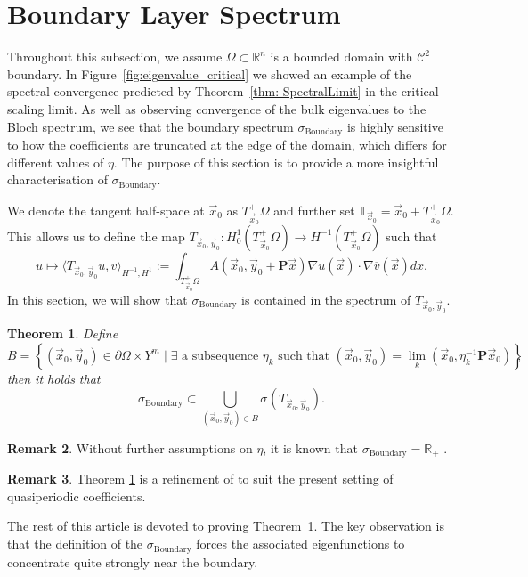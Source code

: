 \documentclass[a4paper,reqno]{amsart}
\numberwithin{equation}{section}
\numberwithin{equation}{section}		%
\numberwithin{figure}{section}			%
\numberwithin{table}{section}				%
\newcommand{\R}{\mathbb{R}}
\newtheorem{theorem}{Theorem}[section]
\theoremstyle{definition}
\newtheorem{remark}[theorem]{Remark}
\newcommand{\<}{\ensuremath \leq}
\renewcommand{\>}{\ensuremath \geq}
\begin{document}
\section{Boundary Layer Spectrum}\label{sec:boundarylayer}

Throughout this subsection, we assume $\Omega\subset\R^n$ is a bounded domain with $\mathcal{C}^{2}$ boundary. In Figure~\ref{fig:eigenvalue_critical} we showed an example of the spectral convergence predicted by Theorem~\ref{thm: SpectralLimit} in the critical scaling limit. As well as observing convergence of the bulk eigenvalues to the Bloch spectrum, we see that the boundary spectrum $\sigma_{\text{Boundary}}$ is highly sensitive to how the coefficients are truncated at the edge of the domain, which differs for different values of $\eta$. The purpose of this section is to provide a more insightful characterisation of $\sigma_{\text{Boundary}}$. 

We denote the tangent half-space at $\vec{x}_0$ as  $ T_{\vec{x}_0}^+\Omega$ and further set
 $\mathbb{T}_{\vec{x}_0} = \vec{x}_0 + T_{\vec{x}_0}^+\Omega$. This allows us to define the map $T_{\vec{x}_0,\vec{y}_0}: H^1_0(T_{\vec{x}_0}^+\Omega)\rightarrow H^{-1}(T_{\vec{x}_0}^+\Omega)$ such that
\begin{equation}
   u\mapsto \langle T_{\vec{x}_0,\vec{y}_0}u,v \rangle_{H^{-1},H^{1}}:=\int_{T_{\vec{x}_0}^+\Omega}A\left( \vec{x}_0, \vec{y}_0+ \textbf{P}\vec{x}\right)\nabla u(\vec{x}) \cdot \nabla \overline{v}(\vec{x}) dx.
\end{equation}
In this section, we will show that $\sigma_{\text{Boundary}}$ is contained in the spectrum of $T_{\vec{x}_0,\vec{y}_0}$.
\begin{theorem}\label{thm: BoundarySpectrum}
    Define 
    \begin{equation*}
        B=\left\{(\vec{x}_0, \vec{y}_0)\in\partial\Omega\times Y^m\mid\exists\text{ a subsequence $\eta_k$ such that }(\vec{x}_0, \vec{y}_0)=\lim_k(\vec{x}_0,\eta_k^{-1}\textbf{P}\vec{x}_0)\right\},
    \end{equation*}
    then it holds that
    \begin{equation}        \sigma_{\text{Boundary}}\subset\bigcup_{(\vec{x}_0,\vec{y}_0)\in B}\sigma_{}(T_{\vec{x}_0,\vec{y}_0}).
    \end{equation}
\end{theorem}
\begin{remark}
    Without further assumptions on $\eta$, it is known that $\sigma_{\text{Boundary}} = \mathbb{R}_+$ \cite{castro1996remarque}.
\end{remark}
\begin{remark}
    Theorem \ref{thm: BoundarySpectrum} is a refinement of \cite[Theorem 7.11]{allaire1998bloch} to suit the present setting of quasiperiodic coefficients.
\end{remark}
The rest of this article is devoted to proving Theorem~\ref{thm: BoundarySpectrum}. The key observation is that the definition of the $\sigma_{\text{Boundary}}$ forces the associated eigenfunctions to concentrate quite strongly near the boundary. 
\end{document}
